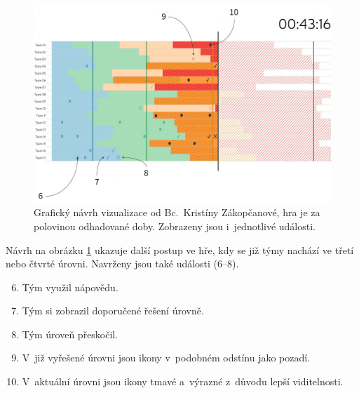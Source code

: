 \documentclass[
  digital, %
  oneside, %
  table,   %
  nolof,     %
  nolot,     %
  nocover
]{fithesis3}
\begin{document}
\begin{figure}[H]
  \begin{center}
    \includegraphics[width=12.7cm]{images/navrh-vizualizace-2-4.png}
  \end{center}
  \caption{Grafický návrh vizualizace od Bc.~Kristíny Zákopčanové, hra je za polovinou odhadované doby. Zobrazeny jsou i~jednotlivé události.}
  \label{fig:progress2}
\end{figure}
Návrh na obrázku \ref{fig:progress2} ukazuje další postup ve hře, kdy se již týmy nachází ve třetí nebo čtvrté úrovni. Navrženy jsou také události (6–8).
\begin{enumerate}
  \setcounter{enumi}{5}
  \item Tým využil nápovědu.
  \item Tým si zobrazil doporučené řešení úrovně.
  \item Tým úroveň přeskočil.
  \item V~již vyřešené úrovni jsou ikony v~podobném odstínu jako pozadí.
  \item V~aktuální úrovni jsou ikony tmavé a~výrazné z~důvodu lepší viditelnosti.
\end{enumerate}
\end{document}
